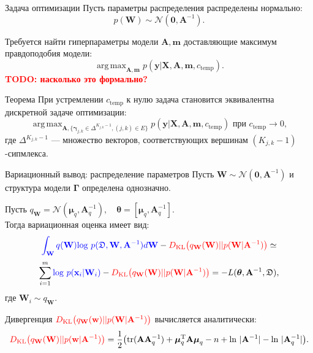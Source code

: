 \documentclass[usenames,dvipsnames,11pt,pdf,utf8,russian,aspectratio=169]{beamer}
\DeclareMathOperator*{\argmax}{arg\,max}
\begin{document}
\begin{frame}{Задача оптимизации}
Пусть параметры распределения распределены нормально:
\[
    p(\mathbf{W}) \sim \mathcal{N}(\mathbf{0}, \mathbf{A}^{-1}).
\]

Требуется найти гиперпараметры модели $\mathbf{A}, \mathbf{m}$ доставляющие максимум правдоподобия модели:
\[
    \argmax_{\mathbf{A}, \mathbf{m}}  p(\mathbf{y}|\mathbf{X},\mathbf{A},\mathbf{m}, c_{\text{temp}}).
\]                                                                                                                            
\textcolor{red}{\textbf{TODO: насколько это формально?\\}}
\begin{block}{Теорема}
При устремлении $c_{\text{temp}}$ к нулю задача становится эквивалентна дискретной задаче оптимизации:
\[
    \argmax_{\mathbf{A}, \{\boldsymbol{\gamma}_{j,k} \in \Delta^{K_{j,k} -1}, (j,k) \in E\}} p(\mathbf{y}|\mathbf{X},\mathbf{A},\mathbf{m}, c_{\text{temp}}) \text{ при }c_{\text{temp}} \to 0,
\]    
где $\Delta^{K_{j,k} -1}$ --- множество векторов, соответствующих вершинам $(K_{j,k}-1)$-сипмлекса.
\end{block}           
\end{frame}  
\fi

    

\begin{frame}{Вариационный вывод: распределение параметров}
Пусть $\mathbf{W} \sim \mathcal{N}(\mathbf{0}, \mathbf{A}^{-1})$ и структура модели $\boldsymbol{\Gamma}$ определена однозначно.

Пусть $q_\mathbf{W} = \mathcal{N}(\boldsymbol{\mu}_q, \mathbf{A}^{-1}_q), \quad \boldsymbol{\theta} =  [\boldsymbol{\mu}_q, \mathbf{A}^{-1}_q].$ \\
Тогда вариационная оценка имеет вид:
$$
\textcolor{blue}{\int_{\mathbf{W}} q(\mathbf{W})\text{log}~{p(\mathfrak{D},\mathbf{W},\mathbf{A}^{-1})} d \mathbf{W}} - \textcolor{red}{D_\text{KL}\bigl(q_\mathbf{W} (\mathbf{W} )|| p (\mathbf{W}|\mathbf{A}^{-1})\bigr)} \simeq
$$
$$
\sum_{i=1}^m \textcolor{blue}{\text{log}~p(\mathbf{x}_i | \mathbf{W}_i)} - \textcolor{red}{D_\text{KL}\bigl(q_\mathbf{W} (\mathbf{W} )|| p (\mathbf{W}|\mathbf{A}^{-1})\bigr)} = -L(\boldsymbol{\theta}, \mathbf{A}^{-1}, \mathfrak{D}),
$$
где $\mathbf{W}_i \sim q_\mathbf{W}$.

Дивергенция $\textcolor{red}{D_\text{KL}\bigl(q_\mathbf{W} (\mathbf{w} )|| p (\mathbf{W}|\mathbf{A}^{-1})\bigr)}$ вычисляется аналитически:
$$
\textcolor{red}{D_\text{KL}\bigl(q_\mathbf{W} (\mathbf{W}) || p (\mathbf{w}|\mathbf{A}^{-1})\bigr)} = \frac{1}{2} \bigl( \text{tr} (\mathbf{A}\mathbf{A}^{-1}_q) + \boldsymbol{\mu}_q^\text{T}\mathbf{A}\boldsymbol{\mu}_q - n +\text{ln}~|\mathbf{A}^{-1}| - \text{ln}~|\mathbf{A}^{-1}_q| \bigr).
$$

\end{frame}
\end{document}
